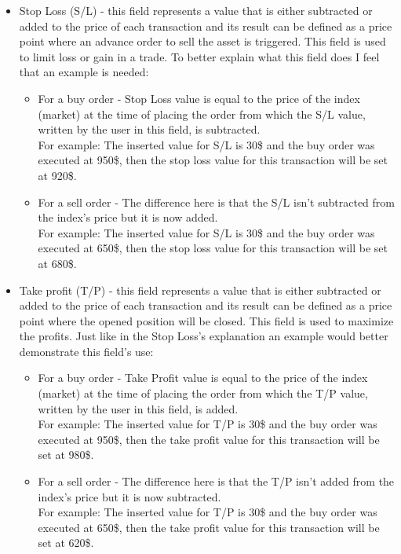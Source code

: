 \documentclass[12pt,a4paper]{report}
\begin{document}
\begin{itemize}
	
	\item Stop Loss (S/L) - this field represents a value that is either subtracted or added to the price of each transaction and its result can be defined as a price point where an advance order to sell the asset is triggered. This field is used to limit loss or gain in a trade. To better explain what this field does I feel that an example is needed:
	\begin{itemize}
		\item For a buy order - Stop Loss value is equal to the price of the index (market) at the time of placing the order from which the S/L value, written by the user in this field, is subtracted. \\
		For example: The inserted value for S/L is 30\$ and the buy order was executed at 950\$, then the stop loss value for this transaction will be set at 920\$.
		\item For a sell order - The difference here is that the S/L isn't subtracted from the index's price but it is now added. \\
		For example: The inserted value for S/L is 30\$ and the buy order was executed at 650\$, then the stop loss value for this transaction will be set at 680\$.
	\end{itemize}

	\item Take profit (T/P) - this field represents a value that is either subtracted or added to the price of each transaction and its result can be defined as a price point where the opened position will be closed. This field is used to maximize the profits. Just like in the Stop Loss's explanation an example would better demonstrate this field's use:
	\begin{itemize}
		\item For a buy order - Take Profit value is equal to the price of the index (market) at the time of placing the order from which the T/P value, written by the user in this field, is added. \\
		For example: The inserted value for T/P is 30\$ and the buy order was executed at 950\$, then the take profit value for this transaction will be set at 980\$.
		\item For a sell order - The difference here is that the T/P isn't added from the index's price but it is now subtracted. \\
		For example: The inserted value for T/P is 30\$ and the buy order was executed at 650\$, then the take profit value for this transaction will be set at 620\$.
	\end{itemize}


\end{itemize}
\end{document}
